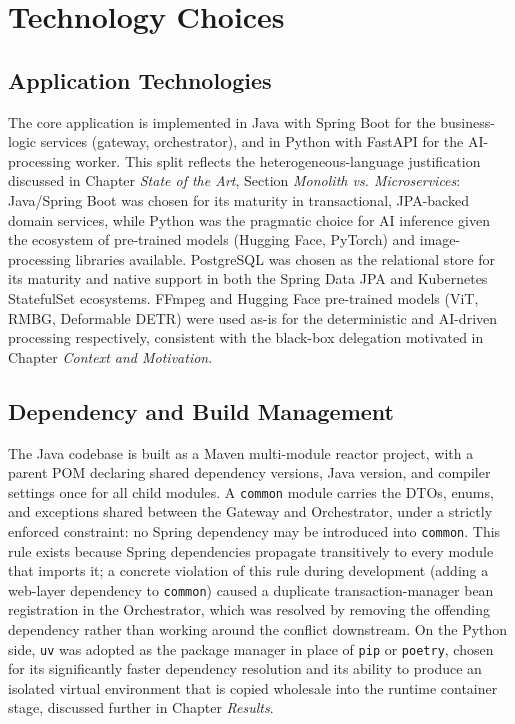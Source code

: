 \documentclass[twoside]{supsistudent}
\begin{document}
\section{Technology Choices}

\subsection{Application Technologies}
The core application is implemented in Java with Spring Boot for the business-logic services (gateway, orchestrator), and in Python with FastAPI for the AI-processing worker. This split reflects the heterogeneous-language justification discussed in Chapter \emph{State of the Art}, Section \emph{Monolith vs. Microservices}: Java/Spring Boot was chosen for its maturity in transactional, JPA-backed domain services, while Python was the pragmatic choice for AI inference given the ecosystem of pre-trained models (Hugging Face, PyTorch) and image-processing libraries available. PostgreSQL was chosen as the relational store for its maturity and native support in both the Spring Data JPA and Kubernetes StatefulSet ecosystems. FFmpeg and Hugging Face pre-trained models (ViT, RMBG, Deformable DETR) were used as-is for the deterministic and AI-driven processing respectively, consistent with the black-box delegation motivated in Chapter \emph{Context and Motivation}.

\subsection{Dependency and Build Management}
The Java codebase is built as a Maven multi-module reactor project, with a parent POM declaring shared dependency versions, Java version, and compiler settings once for all child modules. A \texttt{common} module carries the DTOs, enums, and exceptions shared between the Gateway and Orchestrator, under a strictly enforced constraint: no Spring dependency may be introduced into \texttt{common}. This rule exists because Spring dependencies propagate transitively to every module that imports it; a concrete violation of this rule during development (adding a web-layer dependency to \texttt{common}) caused a duplicate transaction-manager bean registration in the Orchestrator, which was resolved by removing the offending dependency rather than working around the conflict downstream. On the Python side, \texttt{uv} was adopted as the package manager in place of \texttt{pip} or \texttt{poetry}, chosen for its significantly faster dependency resolution and its ability to produce an isolated virtual environment that is copied wholesale into the runtime container stage, discussed further in Chapter \emph{Results}.
\end{document}
